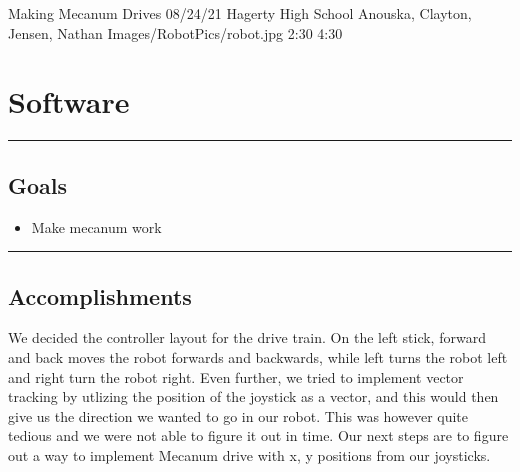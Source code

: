 \insertmeeting 
    {Making Mecanum Drives} 
    {08/24/21}
    {Hagerty High School}
    {Anouska, Clayton, Jensen, Nathan}
    {Images/RobotPics/robot.jpg}
    {2:30}
  {4:30}

\section{Software}
\noindent\hfil\rule{\textwidth}{.4pt}\hfil
\subsection{Goals}
\begin{itemize}
    \item Make mecanum work

\end{itemize} 

\noindent\hfil\rule{\textwidth}{.4pt}\hfil

\subsection*{Accomplishments}
We decided the controller layout for the drive train. On the left stick, forward and back moves the robot forwards and backwards, while left turns the robot left and right turn the robot right. Even further, we tried to implement vector tracking by utlizing the position of the joystick as a vector, and this would then give us the direction we wanted to go in our robot. This was however quite tedious and we were not able to figure it out in time. Our next steps are to figure out a way to implement Mecanum drive with x, y positions from our joysticks.